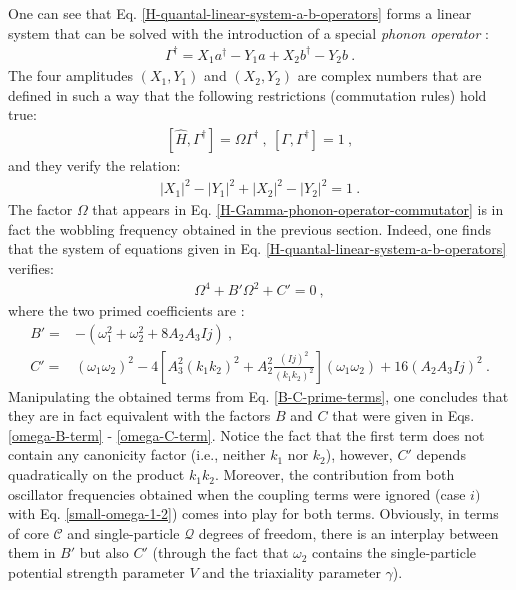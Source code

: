 One can see that Eq. \ref{H-quantal-linear-system-a-b-operators} forms a linear system that can be solved with the introduction of a special \emph{phonon operator} \cite{raduta2017semiclassical,raduta2018wobbling}:
\begin{align}
    \Gamma^\dagger=X_1a^\dagger-Y_1a+X_2b^\dagger-Y_2b\ .
\end{align}
The four amplitudes $(X_1,Y_1)$ and $(X_2,Y_2)$ are complex numbers that are defined in such a way that the following restrictions (commutation rules) hold true:
\begin{align}
    \left[\hat{H},\Gamma^\dagger\right]=\Omega\Gamma^\dagger\ ,\ \left[\Gamma,\Gamma^\dagger\right]=1\ ,
    \label{H-Gamma-phonon-operator-commutator}
\end{align}
and they verify the relation:
\begin{align}
    \left|X_1\right|^2-\left|Y_1\right|^2+\left|X_2\right|^2-\left|Y_2\right|^2=1\ .
\end{align}
The factor $\Omega$ that appears in Eq. \ref{H-Gamma-phonon-operator-commutator} is in fact the wobbling frequency obtained in the previous section. Indeed, one finds that the system of equations given in Eq. \ref{H-quantal-linear-system-a-b-operators} verifies:
\begin{align}
    \Omega^4+B'\Omega^2+C'=0\ ,
\end{align}
where the two primed coefficients are \cite{raduta2020approach}:
\begin{align}
    B'=&-\left(\omega_1^2+\omega_2^2+8A_2A_3Ij\right)\ ,\nonumber\\
    C'=&(\omega_1\omega_2)^2-4\left[A_3^2(k_1k_2)^2+A_2^2\frac{(Ij)^2}{\left(k_1k_2\right)^2}\right]\left(\omega_1\omega_2\right)+16(A_2A_3Ij)^2\ .
    \label{B-C-prime-terms}
\end{align}
Manipulating the obtained terms from Eq. \ref{B-C-prime-terms}, one concludes that they are in fact equivalent with the factors $B$ and $C$ that were given in Eqs. \ref{omega-B-term} - \ref{omega-C-term}. Notice the fact that the first term does not contain any canonicity factor (i.e., neither $k_1$ nor $k_2$), however, $C'$ depends quadratically on the product $k_1k_2$. Moreover, the contribution from both oscillator frequencies obtained when the coupling terms were ignored (case $i)$ with Eq. \ref{small-omega-1-2}) comes into play for both terms. Obviously, in terms of core $\mathscr{C}$ and single-particle $\mathcal{Q}$ degrees of freedom, there is an interplay between them in $B'$ but also $C'$ (through the fact that $\omega_2$ contains the single-particle potential strength parameter $V$ and the triaxiality parameter $\gamma$).

